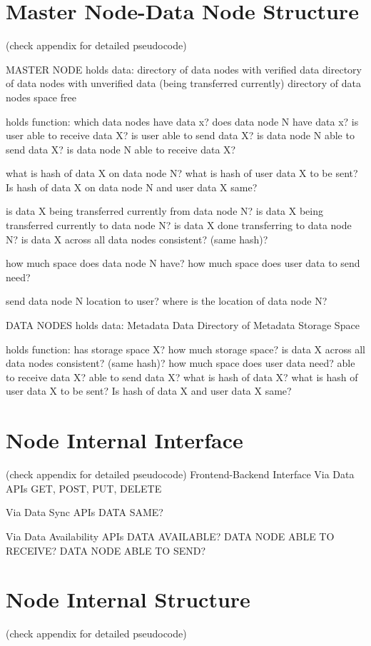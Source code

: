 \documentclass[acmsmall]{acmart}
\begin{document}
\section{Master Node-Data Node Structure}
(check appendix for detailed pseudocode)


MASTER NODE
holds data:
directory of data nodes with verified data
directory of data nodes with unverified data (being transferred currently)
directory of data nodes space free

holds function:
which data nodes have data x?
does data node N have data x?
is user able to receive data X?
is user able to send data X?
is data node N able to send data X?
is data node N able to receive data X?


what is hash of data X on data node N?
what is hash of user data X to be sent?
Is hash of data X on data node N and user data X same?


is data X being transferred currently from data node N?
is data X being transferred currently to data node N?
is data X done transferring to data node N?
is data X across all data nodes consistent? (same hash)?

how much space does data node N have?
how much space does user data to send need?

send data node N location to user?
where is the location of data node N?


DATA NODES
holds data:
Metadata
Data
Directory of Metadata
Storage Space


holds function:
has storage space X?
how much storage space?
is data X across all data nodes consistent? (same hash)?
how much space does user data need?
able to receive data X?
able to send data X?
what is hash of data X?
what is hash of user data X to be sent?
Is hash of data X and user data X same?

\section{Node Internal Interface}
(check appendix for detailed pseudocode)
Frontend-Backend Interface
Via Data APIs
GET, POST, PUT, DELETE

Via Data Sync APIs
DATA SAME? 

Via Data Availability APIs
DATA AVAILABLE?
DATA NODE ABLE TO RECEIVE?
DATA NODE ABLE TO SEND?

\section{Node Internal Structure}
(check appendix for detailed pseudocode)
\end{document}
